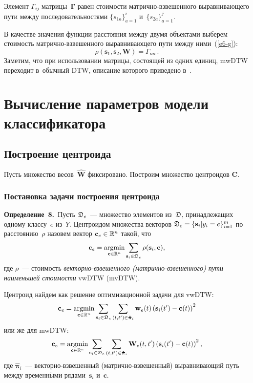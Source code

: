 \begin{multicols}{2}
Элемент $\Gamma_{ij}$ матрицы~$\boldsymbol{\Gamma}$ равен стоимости 
мат\-рич\-но-взве\-шен\-но\-го выравнивающего пути между 
последовательностями $\{{s}_{1a}\}_{a=1}^i$ и~$\{{s}_{2a}\}_{a=1}^j$.

В качестве значения функции расстояния между двумя объектами 
выберем стоимость мат\-рич\-но-взве\-шен\-но\-го выравнивающего пути между ними~(\ref{e6-g}):
\begin{equation*}
\rho(\mathbf{s}_1,\mathbf{s}_2,\mathbf{W})= \Gamma_{nn}\,.
\end{equation*}
Заметим, что при использовании матрицы, состоящей из одних единиц, mwDTW 
переходит в~обычный DTW, описание которого приведено в~\cite{Goncharov}.

\section{Вычисление параметров модели классификатора}

\subsection{Построение центроида}

Пусть множество весов~$\hat{\mathbf{W}}$ фиксировано. Построим множество 
центроидов $\mathbf{C}$.

\subsubsection{Постановка задачи построения центроида}

\noindent
\textbf{Определение~8.}\
Пусть $\mathfrak{D}_e$~--- множество элементов из~$\mathfrak{D}$, принадлежащих одному 
классу~$e$ из~$Y$. Центроидом множества векторов $\fD_e \hm= 
\{\mathbf{s}_i|y_i=e\}_{i=1}^{m}$ по расстоянию~$\rho$ назовем вектор
$\mathbf{c}_e \hm\in \mathbb{R}^n$ такой, что
$$
\mathbf{c}_e = \mathop{\text{argmin}}\limits_{{\textbf{c} \in \mathbb{R}^n}}\sum_{\textbf{s}_i \in \mathfrak{D}_e}{\rho(\textbf{s}_i ,\textbf{c})},$$
где $\rho$~--- стоимость \textit{векторно-взвешенного (мат\-рич\-но-взве\-шен\-но\-го) пути наименьшей стоимости} vwDTW (mvDTW).

Центроид найдем как решение оптимизационной задачи для vwDTW:
 \begin{equation}
 \mathbf{c}_e = \mathop{\mathrm{argmin}}\limits_{{\mathbf{c} \in \mathbb{R}^n}}
 \sum\limits_{\mathbf{s}_i \in \mathfrak{D}_e}
\sum\limits_{(t,t') \in \boldsymbol{\hat{\pi}}_i}\mathbf{w}_e(t)
 \left(\mathbf{s}_i(t')-\mathbf{c}(t)\right)^2
 \label{e8-g}
 \end{equation}
или же для mwDTW:
\begin{equation*}
 \mathbf{c}_e = \mathop{\mathrm{argmin}}\limits_{{\mathbf{c} 
 \in \mathbb{R}^n}}\sum\limits_{\mathbf{s}_i \in \mathfrak{D}_e}
 \sum_{(t,t') \in \boldsymbol{\hat{\pi}}_i}
 \mathbf{W}_e(t,t')\left(\mathbf{s}_i(t')-\mathbf{c}(t)\right)^2,
 \end{equation*}
где $\boldsymbol{\hat{\pi}}_i$~--- век\-тор\-но-взве\-шен\-ный 
(мат\-рич\-но-взве\-шен\-ный) выравнивающий путь между временн$\acute{\mbox{ы}}$ми 
рядами~$\mathbf{s}_i$ и~$\mathbf{c}$.


\end{multicols}
